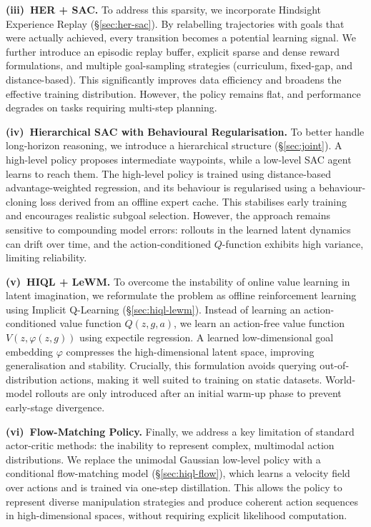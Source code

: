 \textbf{(iii)~HER + SAC.}
To address this sparsity, we incorporate Hindsight Experience Replay
(\S\ref{sec:her-sac}). By relabelling trajectories with goals that were
actually achieved, every transition becomes a potential learning signal.
We further introduce an episodic replay buffer, explicit sparse and dense
reward formulations, and multiple goal-sampling strategies (curriculum,
fixed-gap, and distance-based). This significantly improves data
efficiency and broadens the effective training distribution. However,
the policy remains flat, and performance degrades on tasks requiring
multi-step planning.

\textbf{(iv)~Hierarchical SAC with Behavioural Regularisation.}
To better handle long-horizon reasoning, we introduce a hierarchical
structure (\S\ref{sec:joint}). A high-level policy proposes intermediate
waypoints, while a low-level SAC agent learns to reach them. The
high-level policy is trained using distance-based
advantage-weighted regression, and its behaviour is regularised using a
behaviour-cloning loss derived from an offline expert cache. This
stabilises early training and encourages realistic subgoal selection.
However, the approach remains sensitive to compounding model errors:
rollouts in the learned latent dynamics can drift over time, and the
action-conditioned $Q$-function exhibits high variance, limiting
reliability.

\textbf{(v)~HIQL + LeWM.}
To overcome the instability of online value learning in latent
imagination, we reformulate the problem as offline reinforcement learning
using Implicit Q-Learning (\S\ref{sec:hiql-lewm}). Instead of learning an
action-conditioned value function $Q(z, g, a)$, we learn an action-free
value function $V(z, \varphi(z,g))$ using expectile regression. A learned
low-dimensional goal embedding $\varphi$ compresses the high-dimensional
latent space, improving generalisation and stability. Crucially, this
formulation avoids querying out-of-distribution actions, making it well
suited to training on static datasets. World-model rollouts are only
introduced after an initial warm-up phase to prevent early-stage
divergence.

\textbf{(vi)~Flow-Matching Policy.}
Finally, we address a key limitation of standard actor-critic methods:
the inability to represent complex, multimodal action distributions. We
replace the unimodal Gaussian low-level policy with a conditional
flow-matching model (\S\ref{sec:hiql-flow}), which learns a velocity field
over actions and is trained via one-step distillation. This allows the
policy to represent diverse manipulation strategies and produce coherent
action sequences in high-dimensional spaces, without requiring explicit
likelihood computation.

